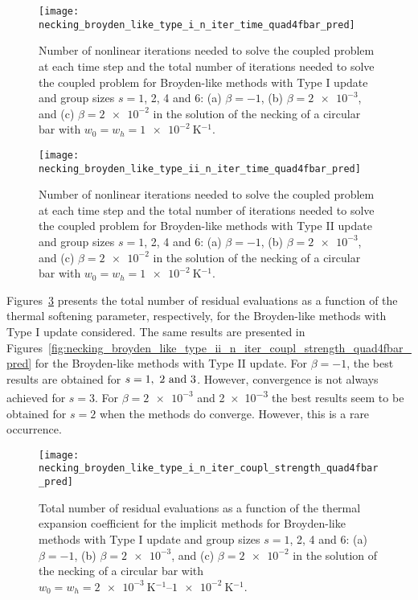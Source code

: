 \begin{figure}[htbp]
 \centering
 \texttt{[image: necking\_broyden\_like\_type\_i\_n\_iter\_time\_quad4fbar\_pred]}
 \caption{
Number of nonlinear iterations needed to solve the coupled problem at each time step and the total number of iterations needed to solve the coupled problem for Broyden-like methods with Type I update and group sizes \(s=1\), 2, 4 and 6: (a) \(\beta=-1\), (b) \(\beta=\num{2e-3}\), and (c) \(\beta=\num{2e-2}\) in the solution of the necking of a circular bar with \(w_0=w_h=\SI{1e-2}{\kelvin^{-1}}\).}
\label{fig:necking_broyden_like_type_i_n_iter_time_quad4fbar_pred}
\end{figure}

\begin{figure}[htbp]
 \centering
 \texttt{[image: necking\_broyden\_like\_type\_ii\_n\_iter\_time\_quad4fbar\_pred]}
 \caption{Number of nonlinear iterations needed to solve the coupled problem at each time step and the total number of iterations needed to solve the coupled problem for Broyden-like methods with Type II update and group sizes \(s=1\), 2, 4 and 6: (a) \(\beta=-1\), (b) \(\beta=\num{2e-3}\), and (c) \(\beta=\num{2e-2}\) in the solution of the necking of a circular bar with \(w_0=w_h=\SI{1e-2}{\kelvin^{-1}}\).}
\label{fig:necking_broyden_like_type_ii_n_iter_time_quad4fbar_pred}
\end{figure}

Figures~\ref{fig:necking_broyden_like_type_i_n_iter_coupl_strength_quad4fbar_pred} presents the total number of residual evaluations as a function of the thermal softening parameter, respectively, for the Broyden-like methods with Type I update considered.
The same results are presented in Figures~\ref{fig:necking_broyden_like_type_ii_n_iter_coupl_strength_quad4fbar_pred} for the Broyden-like methods with Type II update.
For \(\beta=-1\), the best results are obtained for \(s=\SIlist{1; 2; 3}{}\).
However, convergence is not always achieved for \(s=3\).
For \(\beta=\num{2e-3}\) and \num{2e-3} the best results seem to be obtained for \(s=2\) when the methods do converge.
However, this is a rare occurrence.

\begin{figure}[htbp]
 \centering
 \texttt{[image: necking\_broyden\_like\_type\_i\_n\_iter\_coupl\_strength\_quad4fbar\_pred]}
 \caption{Total number of residual evaluations as a function of the thermal expansion coefficient for the implicit methods for Broyden-like methods with Type I update and group sizes \(s=1\), 2, 4 and 6: (a) \(\beta=-1\), (b) \(\beta=\num{2e-3}\), and (c) \(\beta=\num{2e-2}\) in the solution of the necking of a circular bar with \(w_0=w_h=\SIrange{2e-3}{1e-2}{\kelvin^{-1}}\).}
\label{fig:necking_broyden_like_type_i_n_iter_coupl_strength_quad4fbar_pred}
\end{figure}

